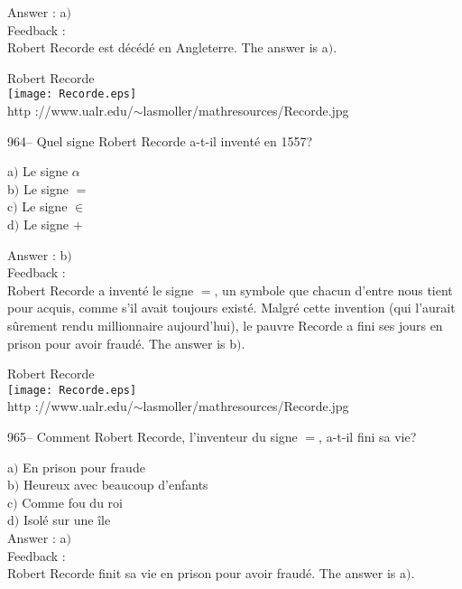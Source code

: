 \documentclass[letterpaper, 12pt]{article}
\begin{document}
Answer : a$)$\\

Feedback : \\
Robert Recorde est d\'ec\'ed\'e en Angleterre. The answer is a$)$.\\

        \begin{center}
        Robert Recorde\\
    \texttt{[image: Recorde.eps]}\\
        {\footnotesize http
://www.ualr.edu/$\sim$lasmoller/mathresources/Recorde.jpg}
    \end{center}

964-- Quel signe Robert Recorde a-t-il invent\'e en 1557?

a$)$ Le signe $\alpha$ \\
b$)$ Le signe $=$ \\
c$)$ Le signe $\in$  \\
d$)$ Le signe $+$

Answer : b$)$\\

Feedback : \\
Robert Recorde a invent\'e le signe $=$, un symbole que chacun
d'entre nous tient pour acquis, comme s'il avait toujours exist\'e.
Malgr\'e cette invention (qui l'aurait s\^urement rendu millionnaire
aujourd'hui), le pauvre Recorde a fini
ses jours en prison pour avoir fraud\'e. The answer is b$)$.\\

        \begin{center}
        Robert Recorde\\
    \texttt{[image: Recorde.eps]}\\
        {\footnotesize http
://www.ualr.edu/$\sim$lasmoller/mathresources/Recorde.jpg}
    \end{center}

965-- Comment Robert Recorde, l'inventeur du signe $=$, a-t-il fini
sa vie?

a$)$ En prison pour fraude \\
b$)$ Heureux avec beaucoup d'enfants  \\
c$)$ Comme fou du roi \\
d$)$ Isol\'e sur une \^ile \\

Answer : a$)$\\

Feedback :\\
Robert Recorde finit sa vie en prison pour avoir fraud\'e. The answer is
a$)$.\\
\end{document}
